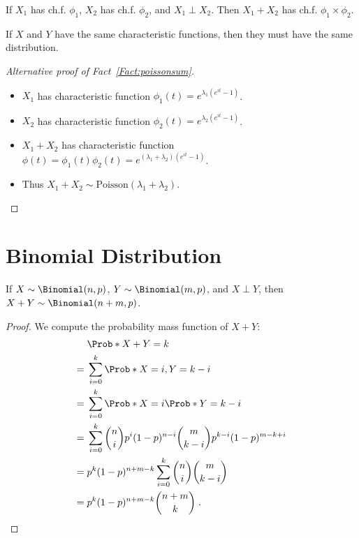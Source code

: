 \begin{fact}
If $X_1$ has ch.f. $\phi_1$, $X_2$ has ch.f. $\phi_2$, and $X_1\perp X_2$. Then
$X_1+X_2$ has ch.f. $\phi_1\times\phi_2$.
\end{fact}

\begin{fact}
If $X$ and $Y$ have the same characteristic functions, then they must have the same distribution.    
\end{fact}

\begin{proof}[Alternative proof of Fact~\ref{Fact:poissonsum}]\;
\begin{itemize}
\item $X_1$ has characteristic function $\phi_1(t)=e^{\lambda_1(e^{it}-1)}$.
\item $X_2$ has characteristic function $\phi_2(t)=e^{\lambda_2(e^{it}-1)}$.
\item $X_1+X_2$ has characteristic function $\phi(t)=\phi_1(t)\phi_2(t)=e^{(\lambda_1+\lambda_2)(e^{it}-1)}$. 
\item Thus $X_1+X_2\sim\mathrm{Poisson}(\lambda_1+\lambda_2)$.
\end{itemize}
\end{proof}

\section{Binomial Distribution}

\begin{fact}\label{Fact:binsum}
If $X\sim\Binomial(n,p)$, $Y\sim\Binomial(m,p)$, and $X\perp Y$, then $X+Y\sim\Binomial(n+m,p)$.
\end{fact}

\begin{proof}
We compute the probability mass function of $X+Y$:
\begin{align*}
& \Prob*{X+Y=k}\\
={} & \sum_{i=0}^{k} \Prob*{X=i,Y=k-i}\\
={} & \sum_{i=0}^{k} \Prob*{X=i}\Prob*{Y=k-i}\\
={} & \sum_{i=0}^{k} \binom{n}{i}p^i(1-p)^{n-i}
\binom{m}{k-i}p^{k-i}(1-p)^{m-k+i}\\
={} & p^k(1-p)^{n+m-k}\sum_{i=0}^{k} \binom{n}{i}\binom{m}{k-i}\\
={} & p^k(1-p)^{n+m-k}\binom{n+m}{k}\;.
\end{align*}
\end{proof}

